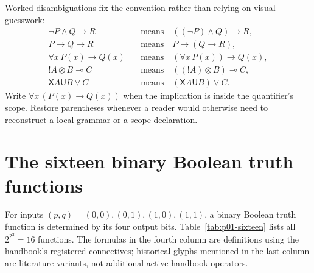 Worked disambiguations fix the convention rather than relying on visual
guesswork:
\[
\begin{aligned}
 \neg P\land Q\to R
   &\quad\text{means}\quad ((\neg P)\land Q)\to R,\\
 P\to Q\to R
   &\quad\text{means}\quad P\to(Q\to R),\\
 \forall x\,P(x)\to Q(x)
   &\quad\text{means}\quad (\forall x\,P(x))\to Q(x),\\
 !A\otimes B\multimap C
   &\quad\text{means}\quad ((!A)\otimes B)\multimap C,\\
 \mathsf X A\mathbin{\mathsf U}B\lor C
   &\quad\text{means}\quad (\mathsf X A\mathbin{\mathsf U}B)\lor C.
\end{aligned}
\]
Write \(\forall x\,(P(x)\to Q(x))\) when the implication is inside the
quantifier's scope.  Restore parentheses whenever a reader would otherwise
need to reconstruct a local grammar or a scope declaration.

\section{The sixteen binary Boolean truth functions}
\label{sec:p01-sixteen-functions}

For inputs \((p,q)=(0,0),(0,1),(1,0),(1,1)\), a binary Boolean truth
function is determined by its four output bits.  Table~\ref{tab:p01-sixteen}
lists all \(2^{2^2}=16\) functions.  The formulas in the fourth column are
definitions using the handbook's registered connectives; historical glyphs
mentioned in the last column are literature variants, not additional active
handbook operators.


